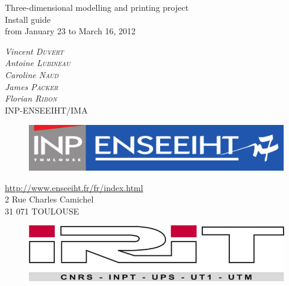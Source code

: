 \documentclass{article}
\begin{document}
\sloppy

\vfill

\begin{center}
	{\Large Three-dimensional modelling and printing project}\\
	\bigskip
	{\Huge Install guide}\\
	\bigskip
	{\Large from January 23 to March 16, 2012}
\end{center}

\bigskip
\bigskip

\begin{center}
\large{
\textit{Vincent \textsc{Duvert} \\
Antoine \textsc{Lubineau} \\
Caroline \textsc{Naud} \\
James \textsc{Packer} \\
Florian \textsc{Ribon}} \\
\bigskip
INP-ENSEEIHT/IMA 
}
\end{center}

\vfill

\begin{figure}[!h]
\begin{center}
	\includegraphics[scale=0.4]{inp-enseeiht}
\end{center}
\end{figure}

\bigskip

\begin{center}
\url{http://www.enseeiht.fr/fr/index.html} \\
2 Rue Charles Camichel \\
31 071 TOULOUSE
\end{center}

\vfill

\begin{figure}[!h]
\begin{center}
	\includegraphics[scale=0.4]{irit}
\end{center}
\end{figure}
\end{document}
